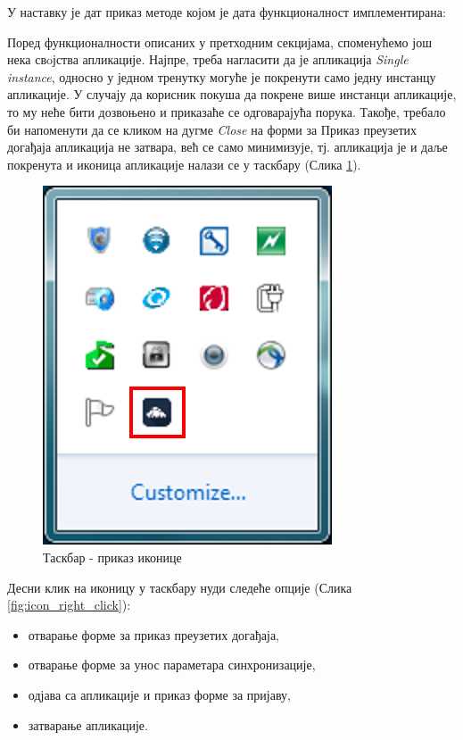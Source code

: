 У наставку је дат приказ методе којом је дата функционалност имплементирана:


Поред функционалности описаних у претходним секцијама, споменућемо још нека свoјства апликације. Најпре, треба нагласити да је апликација \textit{Single instance}, односно у једном тренутку могуће је покренути само једну инстанцу апликације. У случају да корисник покуша да покрене више инстанци апликације, то му неће бити дозвоњено и приказаће се одговарајућа порука. 
Такође, требало би напоменути да се кликом на дугме \textit{Close} на форми за Приказ преузетих догађаја апликација не затвара, већ се само минимизује, тј. апликација је и даље покренута и иконица апликације налази се у таскбару (Слика \ref{fig:application_icon}).

\begin{figure}[H]
	\centering
	\includegraphics[scale=0.5]{slike/ApplicationIcon.png}
	\caption{Таскбар - приказ иконице}
	\label{fig:application_icon}
\end{figure}

Десни клик на иконицу у таскбару нуди следеће опције (Слика \ref{fig:icon_right_click}):
\begin{itemize}
	\item{отварање форме за приказ преузетих догађаја},
	\item{отварање форме за унос параметара синхронизације},
	\item{одјава са апликације и приказ форме за пријаву},
	\item{затварање апликације}.
\end{itemize}

